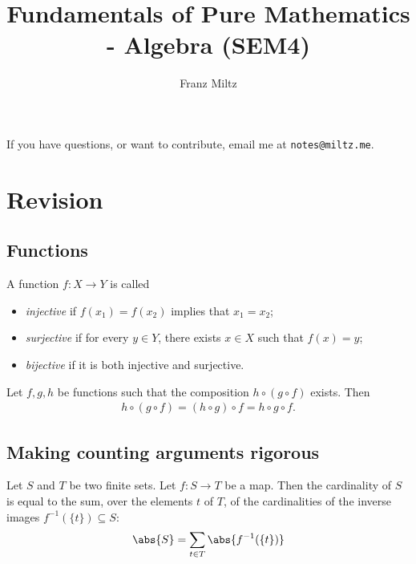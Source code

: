 \documentclass{article}
\begin{document}
\mkfpmthms
\title{Fundamentals of Pure Mathematics - Algebra (SEM4)}
\author{Franz Miltz}
\maketitle
\noindent If you have questions, or want to contribute, email me at \texttt{notes@miltz.me}.
\tableofcontents
\pagebreak

\setcounter{section}{-1}


\section{Revision}


\subsection{Functions}

\begin{definition}
	A function $f:X\to Y$ is called
	\begin{itemize}
		\item \emph{injective} if $f(x_1)=f(x_2)$ implies that $x_1=x_2$;
		\item \emph{surjective} if for every $y\in Y$, there exists $x\in X$ such that $f(x)=y$;
		\item \emph{bijective} if it is both injective and surjective.
	\end{itemize}
\end{definition}

\begin{lemma}
	Let $f,g,h$ be functions such that the composition $h \circ (g \circ f)$ exists. Then
	\begin{align*}
		h \circ (g \circ f) = (h \circ g) \circ f = h \circ g \circ f.
	\end{align*}
\end{lemma}

\subsection{Making counting arguments rigorous}

\begin{theorem}
	Let $S$ and $T$ be two finite sets. Let $f:S\to T$ be a map.
	Then the cardinality of $S$ is equal to the sum, over the elements
	$t$ of $T$, of the cardinalities of the inverse images $f^{-1}(\{t\})\subseteq S$:
	\begin{align*}
		\abs{S} = \sum_{t\in T}\abs{f^{-1}(\{t\})}
	\end{align*}
\end{theorem}
\end{document}
